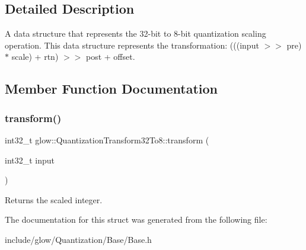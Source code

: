 \subsection{Detailed Description}
A data structure that represents the 32-\/bit to 8-\/bit quantization scaling operation. This data structure represents the transformation\+: (((input $>$$>$ pre) $\ast$ scale) + rtn) $>$$>$ post + offset. 

\subsection{Member Function Documentation}
\mbox{\label{structglow_1_1_quantization_transform32_to8_ab48e7acc8ccd87e09423c7d08dfa0b5f}} 
\subsubsection{\texorpdfstring{transform()}{transform()}}
{\footnotesize\ttfamily int32\+\_\+t glow\+::\+Quantization\+Transform32\+To8\+::transform (\begin{DoxyParamCaption}\item[{int32\+\_\+t}]{input }\end{DoxyParamCaption})\hspace{0.3cm}{\ttfamily [inline]}}

\begin{DoxyReturn}{Returns}
the scaled integer. 
\end{DoxyReturn}


The documentation for this struct was generated from the following file\+:\begin{DoxyCompactItemize}
\item 
include/glow/\+Quantization/\+Base/Base.\+h\end{DoxyCompactItemize}
